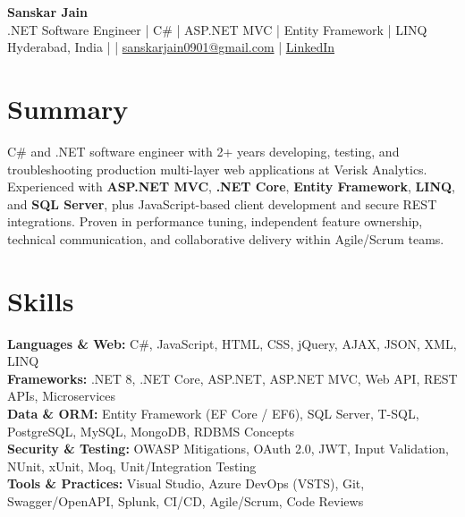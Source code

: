 \documentclass[10pt,letterpaper]{article}
\begin{document}
\begin{center}
    {\Large \textbf{Sanskar Jain}} \\
    .NET Software Engineer \;|\; C\# \;|\; ASP.NET MVC \;|\; Entity Framework \;|\; LINQ \\
    Hyderabad, India \enspace |  \enspace | \enspace
    \href{mailto:sanskarjain0901@gmail.com}{sanskarjain0901@gmail.com} \enspace | \enspace
    \href{https://www.linkedin.com/in/sanskar-jain0901/}{LinkedIn}
\end{center}

\vspace{2pt}

\section*{Summary}
C\# and .NET software engineer with 2+ years developing, testing, and troubleshooting production multi-layer web applications at Verisk Analytics. Experienced with \textbf{ASP.NET MVC}, \textbf{.NET Core}, \textbf{Entity Framework}, \textbf{LINQ}, and \textbf{SQL Server}, plus JavaScript-based client development and secure REST integrations. Proven in performance tuning, independent feature ownership, technical communication, and collaborative delivery within Agile/Scrum teams.

\section*{Skills}
\textbf{Languages \& Web:} C\#, JavaScript, HTML, CSS, jQuery, AJAX, JSON, XML, LINQ \\
\textbf{Frameworks:} .NET 8, .NET Core, ASP.NET, ASP.NET MVC, Web API, REST APIs, Microservices \\
\textbf{Data \& ORM:} Entity Framework (EF Core / EF6), SQL Server, T-SQL, PostgreSQL, MySQL, MongoDB, RDBMS Concepts \\
\textbf{Security \& Testing:} OWASP Mitigations, OAuth 2.0, JWT, Input Validation, NUnit, xUnit, Moq, Unit/Integration Testing \\
\textbf{Tools \& Practices:} Visual Studio, Azure DevOps (VSTS), Git, Swagger/OpenAPI, Splunk, CI/CD, Agile/Scrum, Code Reviews
\end{document}
